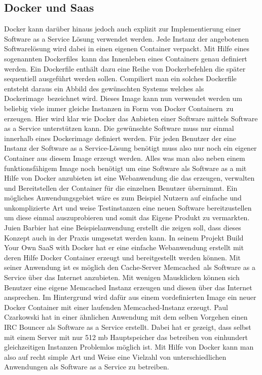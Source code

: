 \subsection{Docker und Saas}
\label{sec:docker_und_saas}
Docker kann darüber hinaus jedoch auch explizit zur Implementierung einer Software as a Service Lösung verwendet werden. Jede Instanz der angebotenen Softwarelösung wird dabei in einen eigenen Container verpackt. Mit Hilfe eines sogenannten \grq Dockerfiles\grq\ kann das Innenleben eines Containers genau definiert werden. Ein Dockerfile enthält dazu eine Reihe von Dockerbefehlen die später sequentiell ausgeführt werden sollen. Compiliert man ein solches Dockerfile entsteht daraus ein Abbild des gewünschten Systems welches als \grq Dockerimage\grq\ bezeichnet wird.
Dieses Image kann nun verwendet werden um beliebig viele immer gleiche Instanzen in Form von \grq Docker Containern\grq\ zu erzeugen.
Hier wird klar wie Docker das Anbieten einer Software mittels Software as a Service unterstützen kann.
Die gewünschte Software muss nur einmal innerhalb eines Dockerimage definiert werden. Für jeden Benutzer der eine Instanz der Software as a Service-Lösung benötigt muss also nur noch ein eigener Container aus diesem Image erzeugt werden. Alles was man also neben einem funktionsfähigem Image noch benötigt um eine Software als Software as a mit Hilfe von Docker anzubieten ist eine Webanwendung die das erzeugen, verwalten und Bereitstellen der Container für die einzelnen Benutzer übernimmt.
Ein mögliches Anwendungsgebiet wäre es zum Beispiel Nutzern auf einfache und unkomplizierte Art und weise Testinstanzen eine neuen Software bereitzustellen um diese einmal auszuprobieren und somit das Eigene Produkt zu vermarkten.
Juien Barbier hat eine Beispielanwendung erstellt die zeigen soll, dass dieses Konzept auch in der Praxis umgesetzt werden kann.
In seinem Projekt \glqq Build Your Own SaaS with Docker\grqq \cite{barbier_build_2013} hat er eine einfache Webanwendung erstellt mit deren Hilfe Docker Container erzeugt und bereitgestellt werden können. Mit seiner Anwendung ist es möglich den Cache-Server \grq Memcached\grq\ als Software as a Service über das Internet anzubieten. Mit wenigen Mausklicken können sich Benutzer eine eigene Memcached Instanz erzeugen und diesen über das Internet ansprechen.
Im Hintergrund wird dafür aus einem vordefinierten Image ein neuer Docker Container mit einer laufenden Memcached-Instanz erzeugt.
Paul Czarkowski hat in einer ähnlichen Anwendung mit dem selben Vorgehen einen  IRC Bouncer als Software as a Service erstellt. Dabei hat er gezeigt, dass selbst mit einem Server mit nur 512 mb Hauptspeicher das betreiben von einhundert gleichzeitigen Instanzen Problemlos möglich ist.
Mit Hilfe von Docker kann man also auf recht simple Art und Weise eine Vielzahl von unterschiedlichen Anwendungen als Software as a Service zu betreiben.